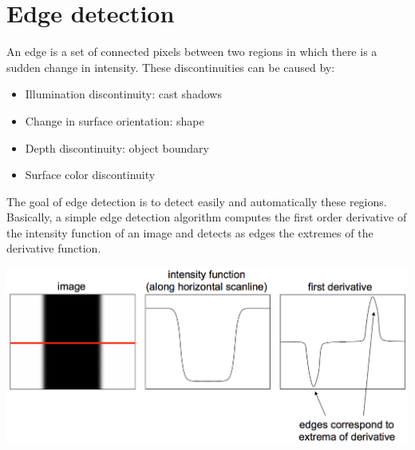 \section{Edge detection}
An edge is a set of connected pixels between two regions in which there is a sudden change in intensity. These discontinuities can be caused by:
\begin{itemize}
    \item Illumination discontinuity: cast shadows
    \item Change in surface orientation: shape
    \item Depth discontinuity: object boundary
    \item Surface color discontinuity
\end{itemize}
The goal of edge detection is to detect easily and automatically these regions.\newline
Basically, a simple edge detection algorithm computes the first order derivative of the intensity function of an image and detects as edges the extremes of the derivative function.
\begin{flushleft}
    \includegraphics[scale = 0.4]{images/edge detection.png}
\end{flushleft}
